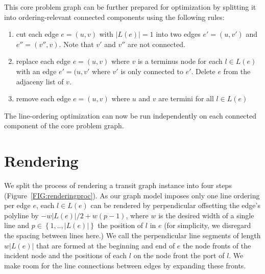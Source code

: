 \documentclass{llncs}
\begin{document}
This core problem graph can be further prepared for optimization by splitting it into ordering-relevant connected components using the following rules:
\begin{enumerate}
	\item cut each edge $e = (u, v)$ with $|L(e)| = 1$ into two edges $e' = (u, v')$ and $e'' = (v'', v)$. Note that $v'$ and $v''$ are not connected.
	\item replace each edge $e = (u, v)$ where $v$ is a terminus node for each $l \in L(e)$ with an edge $e' = (u, v'$ where $v'$ is only connected to $e'$. Delete $e$ from the adjaceny list of $v$.
	\item remove each edge $e = (u, v)$ where $u$ and $v$ are termini for all $l \in L(e)$
\end{enumerate}
The line-ordering optimization can now be run independently on each connected component of the core problem graph.

%
\section{Rendering}\label{SEC:rendering}
%
We split the process of rendering a transit graph instance into four steps (Figure~\ref{FIG:renderingproc}). As our graph model imposes only one line ordering per edge $e$, each $l \in L(e)$ can be rendered by perpendicular offsetting the edge's polyline by $-w\left|L(e)\right|/2 + w\left(p-1\right)$, where $w$ is the desired width of a single line and $p \in \left\{1, .. , \left|L(e)\right|\right\}$ the position of $l$ in $e$ (for simplicity, we disregard the spacing between lines here.) We call the perpendicular line segments of length $w\left|L(e)\right|$ that are formed at the beginning and end of $e$ the node fronts of the incident node and the positions of each $l$ on the node front the port of $l$. We make room for the line connections between edges by expanding these fronts.
\end{document}
